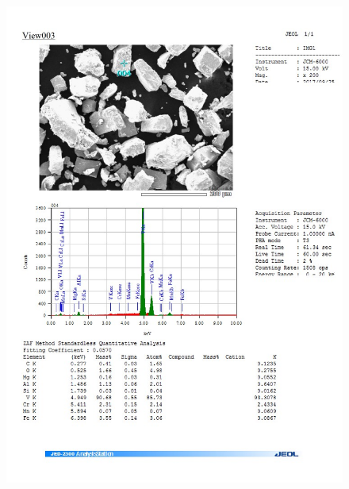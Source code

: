 \documentclass[12pt]{article}
\begin{document}
\begin{figure}[H]
	\includegraphics[width = \linewidth]{./pictures/dot_spec_4.jpg}
\end{figure}
\end{document}
